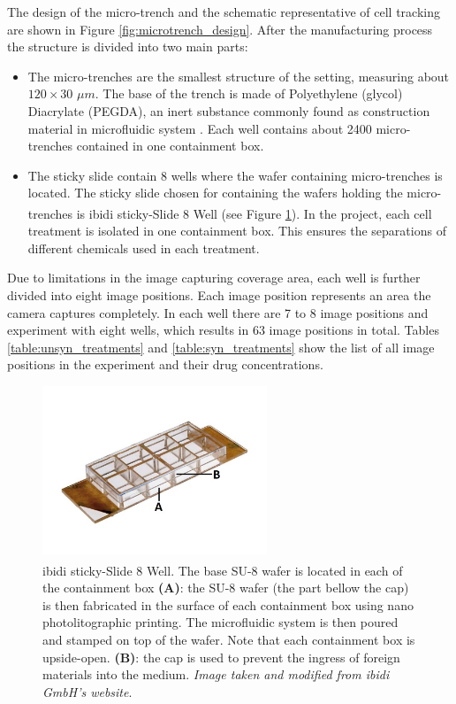 \documentclass[pdftex,12pt,a4paper]{report}
\begin{document}
The design of the micro-trench and the schematic representative of cell tracking are shown in Figure \ref{fig:microtrench_design}. After the manufacturing process the structure is divided into two main parts:

\begin{itemize}
\item The micro-trenches are the smallest structure of the setting, measuring about $120 \times 30$ $\mu m$. The base of the trench is made of Polyethylene (glycol) Diacrylate (PEGDA), an inert substance commonly found as construction material in microfluidic system \cite{sekhavati2015marker}. Each well contains about 2400 micro-trenches contained in one containment box.

\item The sticky slide contain 8 wells where the wafer containing micro-trenches is located. The sticky slide chosen for containing the wafers holding the micro-trenches is ibidi\textsuperscript{\textregistered} sticky-Slide 8 Well (see Figure \ref{fig:ibidi}). In the project, each cell treatment is isolated in one containment box. This ensures
 the separations of different chemicals used in each treatment.

\end{itemize}

Due to limitations in the image capturing coverage area, each well is further divided into eight image positions. Each image position represents an area the camera captures completely. In each well there are 7 to 8 image positions and experiment with eight wells, which results in 63 image positions in total. Tables  \ref{table:unsyn_treatments} and \ref{table:syn_treatments} show the list of all image positions in the experiment and their drug concentrations.

\begin{figure}[H]
\centering
\includegraphics[width=0.6\textwidth]{images/sticky-slide-8-well-marked}
\caption[ibidi\textsuperscript{\textregistered} sticky-Slide 8 Well]{ibidi\textsuperscript{\textregistered} sticky-Slide 8 Well. The base SU-8 wafer is located in each of the containment box \textbf{(A)}: the SU-8 wafer  (the part bellow the cap) is then fabricated in the surface of each containment box using nano photolitographic printing. The microfluidic system is then poured and stamped on top of the wafer. Note that each containment box is upside-open. \textbf{(B)}: the cap is used to prevent the ingress of foreign materials into the medium. \textit{Image taken and modified from ibidi GmbH's website}.}
\label{fig:ibidi}
\end{figure}
\end{document}
